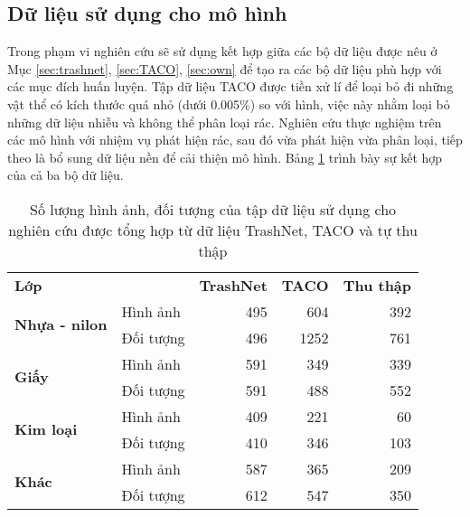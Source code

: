 \documentclass[../the.tex]{subfiles}
\begin{document}
\subsection{Dữ liệu sử dụng cho mô hình}
{\fontsize{13}{12} \selectfont

	Trong phạm vi nghiên cứu sẽ sử dụng kết hợp giữa các bộ dữ liệu được nêu ở Mục \ref{sec:trashnet}, \ref{sec:TACO}, \ref{sec:own} để tạo ra các bộ dữ liệu phù hợp với các mục đích huấn luyện.
	Tập dữ liệu TACO được tiền xử lí để loại bỏ đi những vật thể có kích thước quá nhỏ (dưới 0.005\%) so với hình, việc này nhằm loại bỏ những dữ liệu nhiễu và không thể phân loại rác.
	Nghiên cứu thực nghiệm trên các mô hình với nhiệm vụ phát hiện rác, sau đó vừa phát hiện vừa phân loại, tiếp theo là bổ sung dữ liệu nền để cải thiện mô hình.
	Bảng \ref{tab:datasetmain} trình bày sự kết hợp của cả ba bộ dữ liệu.

}

\begin{table}[!ht]
	\centering
	\caption{Số lượng hình ảnh, đối tượng của tập dữ liệu sử dụng cho nghiên cứu được tổng hợp từ dữ liệu TrashNet, TACO và tự thu thập}
	\begin{tabular}{|l|l|r|r|r|}
		\cline{1-5}
		\textbf{Lớp}                           &            &\textbf{TrashNet} & \textbf{TACO} & \textbf{Thu thập} \\ \cline{1-5}
		\multirow{2}{*}{\textbf{Nhựa - nilon}} & Hình ảnh   & 495               & 604           & 392               \\ \cline{2-5}
		                                       & Đối tượng  & 496               & 1252          & 761               \\ \cline{1-5}
		\multirow{2}{*}{\textbf{Giấy}}         & Hình ảnh   & 591               & 349           & 339               \\ \cline{2-5}
		                                       & Đối tượng  & 591               & 488           & 552               \\ \cline{1-5}
		\multirow{2}{*}{\textbf{Kim loại}}     & Hình ảnh   & 409               & 221           & 60                \\ \cline{2-5}
		                                       & Đối tượng  & 410               & 346           & 103               \\ \cline{1-5}
		\multirow{2}{*}{\textbf{Khác}}     & Hình   ảnh & 587               & 365           & 209               \\ \cline{2-5}
		                                       & Đối tượng  & 612               & 547           & 350               \\ \cline{1-5}
	\end{tabular}
	\label{tab:datasetmain}
\end{table}
\end{document}
